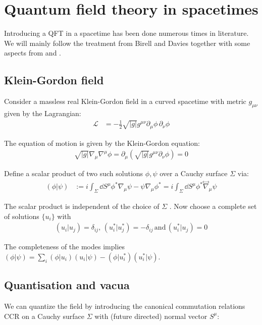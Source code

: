 \chapter{Quantum field theory in spacetimes}

Introducing a QFT in a spacetime has been done numerous times in literature. We will mainly follow the treatment from Birell and Davies \cite{davies} together with some aspects from \cite{krishnan1011.5875} and \cite{Townsend}.    

\section{Klein-Gordon field}
Consider a massless real Klein-Gordon field in a curved spacetime with metric \(g_{\mu\nu}\) given by the Lagrangian:
\begin{align}
\mathcal{L} &= -\frac{1}{2}\sqrt{|g|} g^{\mu\nu} \partial_\mu \phi\,\partial_\nu \phi 
\end{align}

The equation of motion is given by the Klein-Gordon equation:
\begin{align}
\sqrt{|g|}\nabla_\mu\nabla^\mu \phi = \partial_\mu \left(\sqrt{|g|} g^{\mu\nu} \partial_\nu \phi\right) = 0
\end{align}

Define a scalar product of two such solutions $\phi, \psi$ over a Cauchy surface \(\Sigma\) via:
\begin{align}
(\phi|\psi) &:= i \int_{\Sigma}\dd{S^\mu} \phi^*\nabla_\mu \psi - \psi\nabla_\mu \phi^* = i \int_{\Sigma} \dd{S^\mu} \phi^*\overset{\leftrightarrow}{\nabla}_\mu \psi
\end{align}

The scalar product is independent of the choice of \(\Sigma\) \cite{Townsend}. Now choose a complete set of solutions \(\{u_i\}\) with
\begin{align}
(u_i| u_j) = \delta_{ij},\,(u_i^*| u_j^*) = -\delta_{ij}\,\text{and}\,(u_i^*| u_j) = 0
\end{align}

The completeness of the modes implies \((\phi|\psi) = \sum_i (\phi|u_i)(u_i|\psi) - (\phi|u_i^*)(u_i^*|\psi)\).

\section{Quantisation and vacua}
\label{sec:qft_quantisation}
We can quantize the field by introducing the canonical commutation relations CCR on a Cauchy surface \(\Sigma\) with (future directed) normal vector $S^\mu$:

